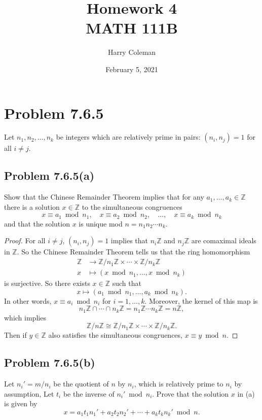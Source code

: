 \documentclass[12pt]{article}
\title{Homework 4\\
    \large MATH 111B
}
\author{Harry Coleman}
\date{February 5, 2021}
\newenvironment{pbox}{\begin{lrbox}{\mybox}\begin{minipage}{0.98\textwidth}}{\end{minipage}\end{lrbox}\begin{center}\framebox[\textwidth]{\usebox{\mybox}}\end{center}}
\theoremstyle{definition}
\newcommand{\Z}{\mathbb{Z}}
\renewcommand{\mod}{\bmod}
\newcommand{\isom}{\cong}
\begin{document}
\maketitle

\section{Problem 7.6.5}
\begin{pbox}
    Let $n_1, n_2, \dots, n_k$ be integers which are relatively prime in pairs: $(n_i, n_j) = 1$ for all $i \ne j$.
\end{pbox}


\subsection{Problem 7.6.5(a)}
\begin{pbox}
    Show that the Chinese Remainder Theorem implies that for any $a_1, \dots, a_k \in \Z$ there is a solution $x \in \Z$ to the simultaneous congruences
    \[
        x \equiv a_1 \mod n_1, \quad x \equiv a_2 \mod n_2, \quad \dots, \quad x \equiv a_k \mod n_k
    \]
    and that the solution $x$ is unique mod $n = n_1 n_2 \cdots n_k$.
\end{pbox}

\begin{proof}
    For all $i \ne j$, $(n_i, n_j) = 1$ implies that $n_i\Z$ and $n_j\Z$ are comaximal ideals in $\Z$. So the Chinese Remainder Theorem tells us that the ring homomorphism
    \begin{align*}
        \Z &\to \Z/n_1\Z \times \cdots \times \Z/n_k\Z \\
        x &\mapsto (x \mod n_1, \dots, x \mod n_k)
    \end{align*}
    is surjective. So there exists $x \in \Z$ such that
    \[
        x \mapsto (a_1 \mod n_1, \dots, a_k \mod n_k).
    \]
    In other words, $x \equiv a_i \mod n_i$ for $i = 1, \dots, k$. Moreover, the kernel of this map is
    \[
        n_1\Z \cap \cdots \cap n_k\Z = n_1\Z \cdots n_k\Z = n\Z,
    \]
    which implies
    \[
        \Z/n\Z \isom \Z/n_1\Z \times \cdots \times \Z/n_k\Z.
    \]
    Then if $y \in \Z$ also satisfies the simultaneous congruences, $x \equiv y \mod n$.
    
\end{proof}

\subsection{Problem 7.6.5(b)}
\begin{pbox}
    Let $n_i' = m/n_i$ be the quotient of $n$ by $n_i$, which is relatively prime to $n_i$ by assumption, Let $t_i$ be the inverse of $n_i' \mod n_i$. Prove that the solution $x$ in (a)  is given by
    \[
        x = a_1t_1n_1' + a_2t_2n_2' + \cdots + a_kt_kn_k' \mod n.
    \]
\end{pbox}
\end{document}
